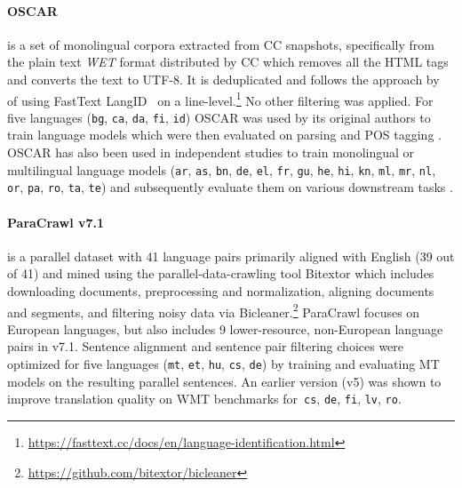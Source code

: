 \paragraph{OSCAR~\citep{ortiz-suarez-etal-2019-asynchronous, ortiz-suarez-etal-2020-monolingual}} is a set of monolingual corpora extracted from CC snapshots, specifically from the plain text \emph{WET} format distributed by CC which removes all the HTML tags and converts the text to UTF-8. It is deduplicated and follows the approach by~\citep{grave-etal-2018-learning} of using FastText LangID~\citep{joulin-etal-2016-fasttext, joulin-etal-2017-bag} on a line-level.\footnote{\url{https://fasttext.cc/docs/en/language-identification.html} } No other filtering was applied. For five languages (\texttt{bg}, \texttt{ca}, \texttt{da}, \texttt{fi}, \texttt{id}) OSCAR was used by its original authors to train language models which were then evaluated on parsing and POS tagging \citep{ortiz-suarez-etal-2020-monolingual}. OSCAR has also been used in independent studies to train monolingual or multilingual language models (\texttt{ar}, \texttt{as}, \texttt{bn}, \texttt{de}, \texttt{el}, \texttt{fr}, \texttt{gu}, \texttt{he}, \texttt{hi}, \texttt{kn}, \texttt{ml}, \texttt{mr}, \texttt{nl}, \texttt{or}, \texttt{pa}, \texttt{ro}, \texttt{ta}, \texttt{te}) and subsequently evaluate them on various downstream tasks \citep{antoun-etal-2021-araelectra, kakwani-etal-2020-indicnlpsuite, wilie-etal-2020-indonlu, chan-etal-2020-germans, koutsikakis-etal-2020-greek, martin-etal-2020-camembert, chriqui-etal-2021-hebert, seker-etal-2021-alephbert, delobelle-etal-2020-robbert, dumitrescu-etal-2020-birth, masala-etal-2020-robert}.


\paragraph{ParaCrawl v7.1} is a parallel dataset with 41 language pairs primarily aligned with English (39 out of 41) and mined using the parallel-data-crawling tool Bitextor \citep{espla-etal-2019-paracrawl,banon-etal-2020-paracrawl} which includes downloading documents, preprocessing and normalization, aligning documents and segments, and filtering noisy data via Bicleaner.\footnote{\url{https://github.com/bitextor/bicleaner}}
ParaCrawl focuses on European languages, but also includes 9 lower-resource, non-European language pairs in v7.1. Sentence alignment and sentence pair filtering choices were optimized for five languages (\texttt{mt}, \texttt{et}, \texttt{hu}, \texttt{cs}, \texttt{de}) by training and evaluating MT models on the resulting parallel sentences. An earlier version (v5) was shown to improve translation quality on WMT benchmarks for~\texttt{cs}, \texttt{de}, \texttt{fi}, \texttt{lv}, \texttt{ro}.


